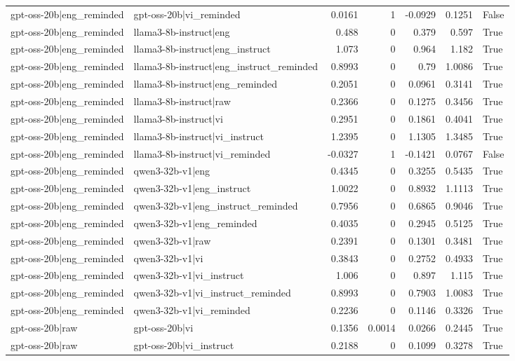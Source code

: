 \begin{table}
\begin{tabular}{l l r r r r l}
gpt-oss-20b|eng_reminded & gpt-oss-20b|vi_reminded & 0.0161 & 1 & -0.0929 & 0.1251 & False \\
gpt-oss-20b|eng_reminded & llama3-8b-instruct|eng & 0.488 & 0 & 0.379 & 0.597 & True \\
gpt-oss-20b|eng_reminded & llama3-8b-instruct|eng_instruct & 1.073 & 0 & 0.964 & 1.182 & True \\
gpt-oss-20b|eng_reminded & llama3-8b-instruct|eng_instruct_reminded & 0.8993 & 0 & 0.79 & 1.0086 & True \\
gpt-oss-20b|eng_reminded & llama3-8b-instruct|eng_reminded & 0.2051 & 0 & 0.0961 & 0.3141 & True \\
gpt-oss-20b|eng_reminded & llama3-8b-instruct|raw & 0.2366 & 0 & 0.1275 & 0.3456 & True \\
gpt-oss-20b|eng_reminded & llama3-8b-instruct|vi & 0.2951 & 0 & 0.1861 & 0.4041 & True \\
gpt-oss-20b|eng_reminded & llama3-8b-instruct|vi_instruct & 1.2395 & 0 & 1.1305 & 1.3485 & True \\
gpt-oss-20b|eng_reminded & llama3-8b-instruct|vi_reminded & -0.0327 & 1 & -0.1421 & 0.0767 & False \\
gpt-oss-20b|eng_reminded & qwen3-32b-v1|eng & 0.4345 & 0 & 0.3255 & 0.5435 & True \\
gpt-oss-20b|eng_reminded & qwen3-32b-v1|eng_instruct & 1.0022 & 0 & 0.8932 & 1.1113 & True \\
gpt-oss-20b|eng_reminded & qwen3-32b-v1|eng_instruct_reminded & 0.7956 & 0 & 0.6865 & 0.9046 & True \\
gpt-oss-20b|eng_reminded & qwen3-32b-v1|eng_reminded & 0.4035 & 0 & 0.2945 & 0.5125 & True \\
gpt-oss-20b|eng_reminded & qwen3-32b-v1|raw & 0.2391 & 0 & 0.1301 & 0.3481 & True \\
gpt-oss-20b|eng_reminded & qwen3-32b-v1|vi & 0.3843 & 0 & 0.2752 & 0.4933 & True \\
gpt-oss-20b|eng_reminded & qwen3-32b-v1|vi_instruct & 1.006 & 0 & 0.897 & 1.115 & True \\
gpt-oss-20b|eng_reminded & qwen3-32b-v1|vi_instruct_reminded & 0.8993 & 0 & 0.7903 & 1.0083 & True \\
gpt-oss-20b|eng_reminded & qwen3-32b-v1|vi_reminded & 0.2236 & 0 & 0.1146 & 0.3326 & True \\
gpt-oss-20b|raw & gpt-oss-20b|vi & 0.1356 & 0.0014 & 0.0266 & 0.2445 & True \\
gpt-oss-20b|raw & gpt-oss-20b|vi_instruct & 0.2188 & 0 & 0.1099 & 0.3278 & True \\

\end{tabular}
\end{table}
